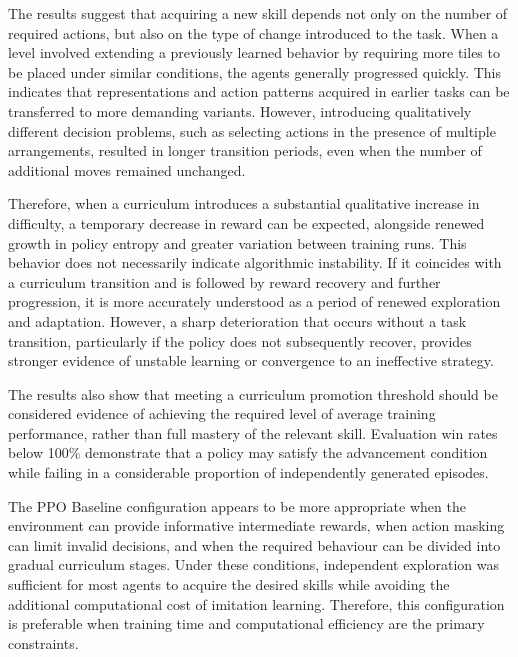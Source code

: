 The results suggest that acquiring a new skill depends not only on the number of required actions, but also on the type of change introduced to the task. When a level involved extending a previously learned behavior by requiring more tiles to be placed under similar conditions, the agents generally progressed quickly. This indicates that representations and action patterns acquired in earlier tasks can be transferred to more demanding variants. However, introducing qualitatively different decision problems, such as selecting actions in the presence of multiple arrangements, resulted in longer transition periods, even when the number of additional moves remained unchanged.

Therefore, when a curriculum introduces a substantial qualitative increase in difficulty, a temporary decrease in reward can be expected, alongside renewed growth in policy entropy and greater variation between training runs. This behavior does not necessarily indicate algorithmic instability. If it coincides with a curriculum transition and is followed by reward recovery and further progression, it is more accurately understood as a period of renewed exploration and adaptation. However, a sharp deterioration that occurs without a task transition, particularly if the policy does not subsequently recover, provides stronger evidence of unstable learning or convergence to an ineffective strategy.


The results also show that meeting a curriculum promotion threshold should be considered evidence of achieving the required level of average training performance, rather than full mastery of the relevant skill. Evaluation win rates below 100\% demonstrate that a policy may satisfy the advancement condition while failing in a considerable proportion of independently generated episodes.

The PPO Baseline configuration appears to be more appropriate when the environment can provide informative intermediate rewards, when action masking can limit invalid decisions, and when the required behaviour can be divided into gradual curriculum stages. Under these conditions, independent exploration was sufficient for most agents to acquire the desired skills while avoiding the additional computational cost of imitation learning. Therefore, this configuration is preferable when training time and computational efficiency are the primary constraints.

